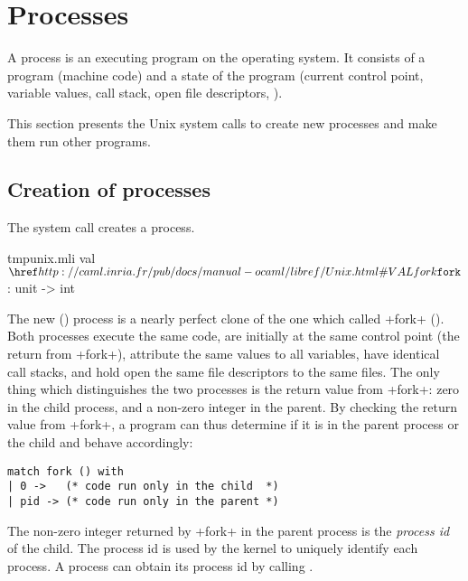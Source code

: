 %
%

\chapter{Processes}
\label{sec/processes}

A process is an executing program on the operating system.  It
consists of a program (machine code) and a state of the program
(current control point, variable values, call stack, open file
descriptors, \etc).

This section presents the Unix system calls to create new processes
and make them run other programs.

\section{Creation of processes}

The system call  creates a process.
%
\begin{listingcodefile}{tmpunix.mli}
val $\libvalue{Unix}{fork}$ : unit -> int
\end{listingcodefile}
%
The new () process is a nearly perfect clone of the
one which called \ml+fork+ ().  Both processes execute
the same code, are initially at the same control point (the return
from \ml+fork+), attribute the same values to all variables, have
identical call stacks, and hold open the same file descriptors to
the same files.  The only thing which distinguishes the two processes
is the return value from \ml+fork+: zero in the child process,
and a non-zero integer in the parent.  By checking the return value
from \ml+fork+, a program can thus determine if it is in the parent
process or the child and behave accordingly: 
%
\begin{lstlisting}
match fork () with
| 0 ->   (* code run only in the child  *)
| pid -> (* code run only in the parent *)
\end{lstlisting}
%
The non-zero integer returned by \ml+fork+ in the parent process
is the \emph{process id} of the child.  The process id is used by
the kernel to uniquely identify each process.  A process can obtain
its process id by calling .

